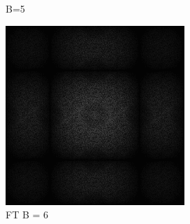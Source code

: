 \begin{figure}[H]
\begin{tcolorbox}[boxrule=4pt,sharp corners=downhill,title=Verschiedene Blockgrößen]
\begin{subfigure}[b]{0.2\linewidth}
         \caption{B=5}
         \label{pic:screen_B5}
    \end{subfigure}
    \centering
    \begin{subfigure}[b]{0.2\linewidth}
      \includegraphics[width=\linewidth]{content/TemporalerAlg/Bilder/Sorting/DiffDimensions/6/seed_debug_5.0_small.png}
       \caption{FT B = 6}
       \label{pic:fftB_6}
    \end{subfigure}
    \begin{subfigure}[b]{0.2\linewidth}

\end{subfigure}
\end{tcolorbox}
\end{figure}

